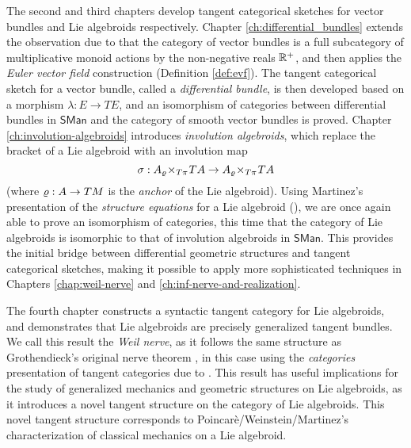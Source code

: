 The second and third chapters develop tangent categorical sketches for vector bundles and Lie algebroids respectively. Chapter \ref{ch:differential_bundles} extends the observation due to \cite{Grabowski2009} that the category of vector bundles is a full subcategory of multiplicative monoid actions by the non-negative reals $\mathbb{R}^+$, and then applies the \emph{Euler vector field} construction (Definition \ref{def:evf}). The tangent categorical sketch for a vector bundle, called a \emph{differential bundle}, is then developed based on a morphism $\lambda:E \to TE$,  and an isomorphism of categories between differential bundles in $\mathsf{SMan}$ and the category of smooth vector bundles is proved. Chapter \ref{ch:involution-algebroids} introduces \emph{involution algebroids}, which replace the bracket of a Lie algebroid with an involution map
\[
   \sigma: A {_{\varrho}}\!\times_{T\pi}\! TA \to A {_{\varrho}}\!\times_{T\pi}\! TA
\]
(where $\varrho:A \to TM$ is the \emph{anchor} of the Lie algebroid). Using Martinez's presentation of the \emph{structure equations} for a Lie algebroid (\cite{Martinez2001}), we are once again able to prove an isomorphism of categories, this time that the category of Lie algebroids is isomorphic to that of involution algebroids in $\mathsf{SMan}$. This provides the initial bridge between differential geometric structures and tangent categorical sketches, making it possible to apply more sophisticated techniques in Chapters \ref{chap:weil-nerve} and \ref{ch:inf-nerve-and-realization}.




The fourth chapter constructs a syntactic tangent category for Lie algebroids, and demonstrates that Lie algebroids are precisely generalized tangent bundles. We call this result the \emph{Weil nerve}, as it follows the same structure as Grothendieck's original nerve theorem \cite{Segal1974}, in this case using the \emph{categories} presentation of tangent categories due to \cite{Leung2017}. This result has useful implications for the study of generalized mechanics and geometric structures on Lie algebroids, as it introduces a novel tangent structure on the category of Lie algebroids. This novel tangent structure corresponds to Poincar\`{e}/Weinstein/Martinez's characterization of classical mechanics on a Lie algebroid.


